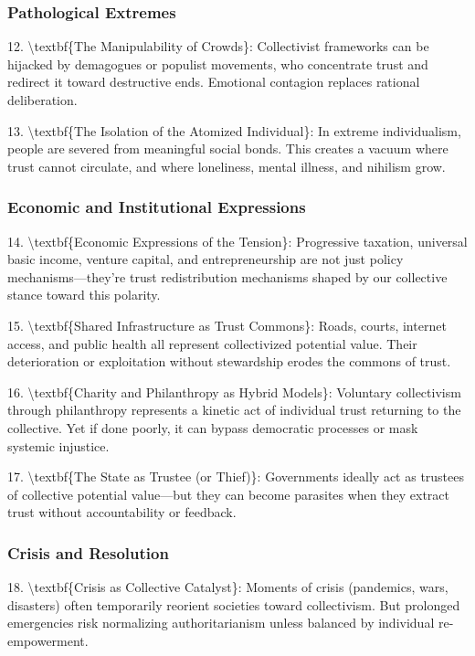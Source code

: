 \documentclass[11pt,oneside]{book}
\begin{document}
\subsubsection{Pathological Extremes}

12. \textbackslash textbf\{The Manipulability of Crowds\}: Collectivist frameworks can be hijacked by demagogues or populist movements, who concentrate trust and redirect it toward destructive ends. Emotional contagion replaces rational deliberation.

13. \textbackslash textbf\{The Isolation of the Atomized Individual\}: In extreme individualism, people are severed from meaningful social bonds. This creates a vacuum where trust cannot circulate, and where loneliness, mental illness, and nihilism grow.

\subsubsection{Economic and Institutional Expressions}

14. \textbackslash textbf\{Economic Expressions of the Tension\}: Progressive taxation, universal basic income, venture capital, and entrepreneurship are not just policy mechanisms—they're trust redistribution mechanisms shaped by our collective stance toward this polarity.

15. \textbackslash textbf\{Shared Infrastructure as Trust Commons\}: Roads, courts, internet access, and public health all represent collectivized potential value. Their deterioration or exploitation without stewardship erodes the commons of trust.

16. \textbackslash textbf\{Charity and Philanthropy as Hybrid Models\}: Voluntary collectivism through philanthropy represents a kinetic act of individual trust returning to the collective. Yet if done poorly, it can bypass democratic processes or mask systemic injustice.

17. \textbackslash textbf\{The State as Trustee (or Thief)\}: Governments ideally act as trustees of collective potential value—but they can become parasites when they extract trust without accountability or feedback.

\subsubsection{Crisis and Resolution}

18. \textbackslash textbf\{Crisis as Collective Catalyst\}: Moments of crisis (pandemics, wars, disasters) often temporarily reorient societies toward collectivism. But prolonged emergencies risk normalizing authoritarianism unless balanced by individual re-empowerment.
\end{document}
